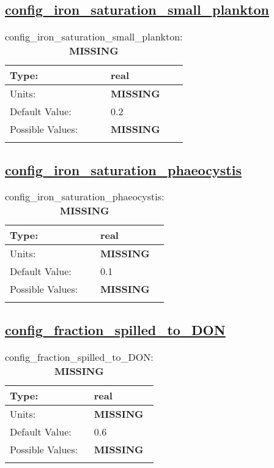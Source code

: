 \subsection[config\_iron\_saturation\_small\_plankton]{\hyperref[sec:nm_tab_biogeochemistry]{config\_iron\_saturation\_small\_plankton}}
\label{subsec:nm_sec_config_iron_saturation_small_plankton}
\begin{center}
\begin{longtable}{| p{2.0in} || p{4.0in} |}
    \hline
    Type: & real \\
    \hline
    Units: & {\bf \color{red} MISSING} \\
    \hline
    Default Value: & 0.2 \\
    \hline
    Possible Values: & {\bf \color{red} MISSING} \\
    \hline
    \caption{config\_iron\_saturation\_small\_plankton: {\bf \color{red} MISSING}}
\end{longtable}
\end{center}
\subsection[config\_iron\_saturation\_phaeocystis]{\hyperref[sec:nm_tab_biogeochemistry]{config\_iron\_saturation\_phaeocystis}}
\label{subsec:nm_sec_config_iron_saturation_phaeocystis}
\begin{center}
\begin{longtable}{| p{2.0in} || p{4.0in} |}
    \hline
    Type: & real \\
    \hline
    Units: & {\bf \color{red} MISSING} \\
    \hline
    Default Value: & 0.1 \\
    \hline
    Possible Values: & {\bf \color{red} MISSING} \\
    \hline
    \caption{config\_iron\_saturation\_phaeocystis: {\bf \color{red} MISSING}}
\end{longtable}
\end{center}
\subsection[config\_fraction\_spilled\_to\_DON]{\hyperref[sec:nm_tab_biogeochemistry]{config\_fraction\_spilled\_to\_DON}}
\label{subsec:nm_sec_config_fraction_spilled_to_DON}
\begin{center}
\begin{longtable}{| p{2.0in} || p{4.0in} |}
    \hline
    Type: & real \\
    \hline
    Units: & {\bf \color{red} MISSING} \\
    \hline
    Default Value: & 0.6 \\
    \hline
    Possible Values: & {\bf \color{red} MISSING} \\
    \hline
    \caption{config\_fraction\_spilled\_to\_DON: {\bf \color{red} MISSING}}
\end{longtable}
\end{center}
